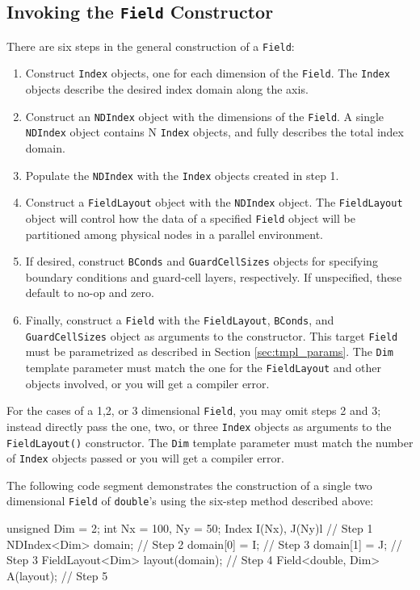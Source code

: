 \subsection{Invoking the \texttt{Field} Constructor} \label{sec:inv_field}

There are six steps in the general construction of a \texttt{Field}:
\begin{enumerate}
    \item Construct \texttt{Index} objects, one for each dimension of the \texttt{Field}. The \texttt{Index} objects describe the desired index domain along the axis.
    \item Construct an \texttt{NDIndex} object with the dimensions of the \texttt{Field}. A single \texttt{NDIndex} object contains N \texttt{Index} objects, and fully describes the total index domain.
    \item Populate the \texttt{NDIndex} with the \texttt{Index} objects created in step 1.
    \item Construct a \texttt{FieldLayout} object with the \texttt{NDIndex} object. The \texttt{FieldLayout} object will control how the data of a specified \texttt{Field} object will be partitioned among physical nodes in a parallel environment.
    \item If desired, construct \texttt{BConds} and \texttt{GuardCellSizes} objects for specifying boundary conditions and guard-cell layers, respectively. If unspecified, these default to no-op and zero.
    \item Finally, construct a \texttt{Field} with the \texttt{FieldLayout}, \texttt{BConds}, and \texttt{GuardCellSizes} object as arguments to the constructor. This target \texttt{Field} must be parametrized as described in Section \ref{sec:tmpl_params}. The \texttt{Dim} template parameter must match the one for the \texttt{FieldLayout} and other objects involved, or you will get a compiler error.
\end{enumerate}

For the cases of a 1,2, or 3 dimensional \texttt{Field}, you may omit steps 2 and 3; instead directly pass the one, two, or three \texttt{Index} objects as arguments to the \texttt{FieldLayout()} constructor. The \texttt{Dim} template parameter must match the number of \texttt{Index} objects passed or you will get a compiler error.

The following code segment demonstrates the construction of a single two dimensional \texttt{Field} of \texttt{double}'s using the six-step method described above: \\
\begin{code}
unsigned Dim = 2;
int Nx = 100, Ny = 50;
Index I(Nx), J(Ny)l                 // Step 1
NDIndex<Dim> domain;                // Step 2
domain[0] = I;                      // Step 3
domain[1] = J;                      // Step 3
FieldLayout<Dim> layout(domain);    // Step 4
Field<double, Dim> A(layout);       // Step 5
\end{code}

